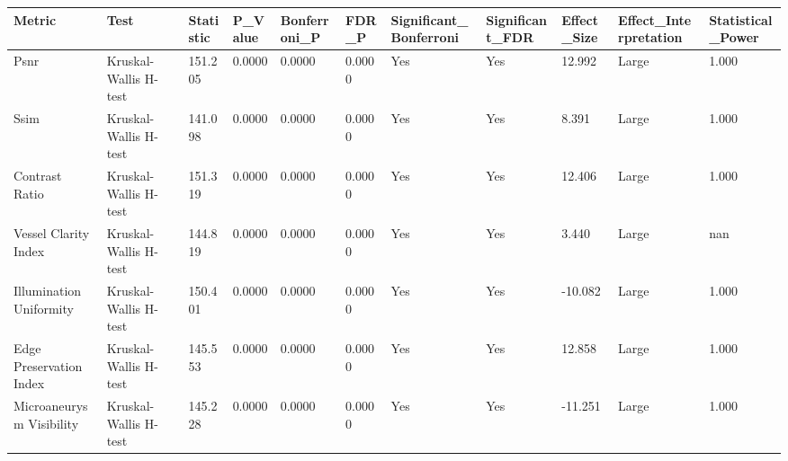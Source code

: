 \begin{tabular}{lllllllllll}
\toprule
Metric & Test & Statistic & P_Value & Bonferroni_P & FDR_P & Significant_Bonferroni & Significant_FDR & Effect_Size & Effect_Interpretation & Statistical_Power \\
\midrule
Psnr & Kruskal-Wallis H-test & 151.205 & 0.0000 & 0.0000 & 0.0000 & Yes & Yes & 12.992 & Large & 1.000 \\
Ssim & Kruskal-Wallis H-test & 141.098 & 0.0000 & 0.0000 & 0.0000 & Yes & Yes & 8.391 & Large & 1.000 \\
Contrast Ratio & Kruskal-Wallis H-test & 151.319 & 0.0000 & 0.0000 & 0.0000 & Yes & Yes & 12.406 & Large & 1.000 \\
Vessel Clarity Index & Kruskal-Wallis H-test & 144.819 & 0.0000 & 0.0000 & 0.0000 & Yes & Yes & 3.440 & Large & nan \\
Illumination Uniformity & Kruskal-Wallis H-test & 150.401 & 0.0000 & 0.0000 & 0.0000 & Yes & Yes & -10.082 & Large & 1.000 \\
Edge Preservation Index & Kruskal-Wallis H-test & 145.553 & 0.0000 & 0.0000 & 0.0000 & Yes & Yes & 12.858 & Large & 1.000 \\
Microaneurysm Visibility & Kruskal-Wallis H-test & 145.228 & 0.0000 & 0.0000 & 0.0000 & Yes & Yes & -11.251 & Large & 1.000 \\
\bottomrule
\end{tabular}
